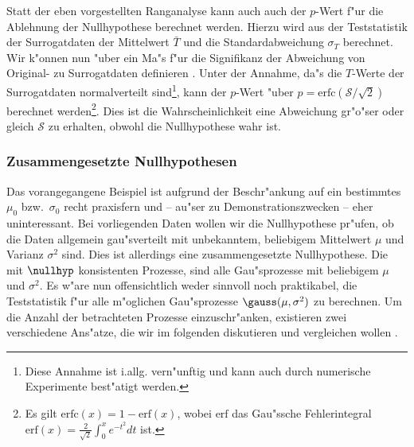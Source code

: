 Statt der eben vorgestellten Ranganalyse kann auch auch der $p$-Wert f"ur die Ablehnung der
Nullhypothese berechnet werden. Hierzu wird aus der Teststatistik der Surrogatdaten der
Mittelwert $\bar T$ und die Standardabweichung $\sigma_T$ berechnet. Wir k"onnen nun "uber
ein Ma"s f"ur die Signifikanz der Abweichung von Original- zu Surrogatdaten definieren
\cite{Theiler92b}. Unter der Annahme, da"s die $T$-Werte der Surrogatdaten normalverteilt
sind\footnote{Diese Annahme ist i.allg. vern"unftig und kann auch durch numerische
  Experimente best"atigt werden.}, kann der $p$-Wert "uber $p =
\mathrm{erfc}(\mathcal{S}/\sqrt2)$ berechnet werden\footnote{Es gilt
  $\mathrm{erfc}(x)=1-\mathrm{erf}(x)$, wobei $\mathrm{erf}$ das Gau"ssche Fehlerintegral
  $\mathrm{erf}(x)=\frac2{\sqrt{2}}\int_0^xe^{-t^2} dt$ ist. }.  Dies ist die
Wahrscheinlichkeit eine Abweichung gr"o"ser oder gleich $\mathcal{S}$ zu erhalten, obwohl
die Nullhypothese wahr ist.


\subsubsection{Zusammengesetzte Nullhypothesen}
Das vorangegangene Beispiel ist aufgrund der Beschr"ankung auf ein bestimmtes $\mu_0$
bzw.\ $\sigma_0$ recht praxisfern und -- au"ser zu Demonstrationszwecken -- eher
uninteressant. Bei vorliegenden Daten wollen wir die Nullhypothese pr"ufen, ob die Daten
allgemein gau"sverteilt mit unbekanntem, beliebigem Mittelwert $\mu$ und Varianz
$\sigma^2$ sind. Dies ist allerdings eine zusammengesetzte Nullhypothese. Die mit
$\nullhyp$ konsistenten Prozesse, sind alle Gau"sprozesse mit beliebigem $\mu$ und
$\sigma^2$. Es w"are nun offensichtlich weder sinnvoll noch praktikabel, die Teststatistik
 f"ur alle m"oglichen Gau"sprozesse $\gauss(\mu,\sigma^2)$ zu
berechnen. Um die Anzahl der betrachteten Prozesse einzuschr"anken, existieren zwei
verschiedene Ans"atze, die wir im folgenden diskutieren und vergleichen wollen
\cite{Prichard-theiler3}.

